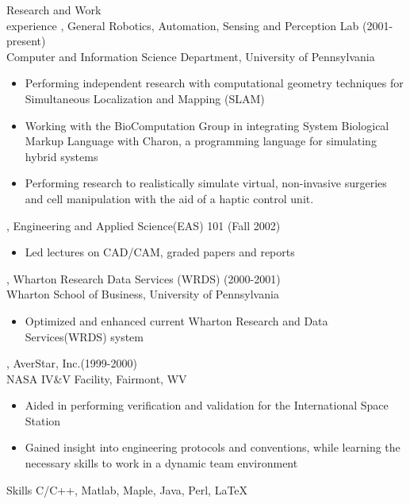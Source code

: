 \documentclass{resume}
\begin{document}
\begin{category}{Research and Work \\experience}
, General Robotics, Automation, Sensing and Perception Lab (2001-present) \\
Computer and Information Science Department, University of Pennsylvania
\begin{itemize}
  \item Performing independent research with computational geometry techniques for \\ Simultaneous Localization and Mapping (SLAM)
  \item Working with the BioComputation Group in integrating System Biological Markup Language with Charon, a programming language for simulating hybrid systems
  \item Performing research to realistically simulate virtual, non-invasive 
                surgeries\\ and cell manipulation  with the aid of a haptic control unit.
\end{itemize}
, Engineering and Applied Science(EAS) 101 (Fall 2002)
\begin{itemize}
  \item Led lectures on CAD/CAM, graded papers and reports
\end{itemize}
, Wharton Research Data Services (WRDS)  (2000-2001)\\
Wharton School of Business, University of Pennsylvania
\begin{itemize} 
\item Optimized and enhanced current Wharton Research and Data Services(WRDS) system
\end{itemize}
, AverStar, Inc.(1999-2000)\\ 
NASA IV\&V Facility, Fairmont, WV 
\begin{itemize}
\item Aided in performing verification and validation for the International Space Station
\item Gained insight into engineering protocols and conventions, while learning the necessary skills to work in a dynamic team environment
\end{itemize}
\end{category}

\begin{category}{Skills}
\citembullet C/C++, Matlab, Maple, Java, Perl, LaTeX
\end{category}
\end{document}
